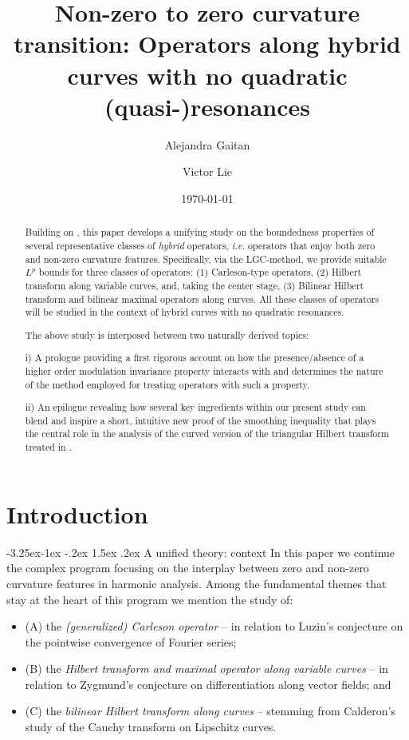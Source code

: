 \documentclass[a4paper,reqno]{amsart}
\title[Operators along hybrid curves]{\Large{Non-zero to zero curvature transition: Operators along hybrid curves with no quadratic (quasi-)resonances}}
\author[A. Gaitan]{Alejandra Gaitan}
\author[V. Lie]{Victor Lie}
\date{\today}
\makeatletter
\def\subsection{\@startsection{subsection}{2}{\z@}%
	{-3.25ex\@plus -1ex \@minus -.2ex}%
	{1.5ex \@plus .2ex}%
	{\normalfont\bfseries\boldmath}}
\numberwithin{equation}{section}
\theoremstyle{definition}
\makeatother
\begin{document}
\maketitle

\begin{abstract} Building on \cite{Lie19}, this paper develops a unifying study on the boundedness properties of several representative classes of \emph{hybrid} operators, \textit{i.e.} operators that enjoy both zero and non-zero curvature features. Specifically, via the LGC-method, we provide suitable $L^p$ bounds for three classes of operators: (1) Carleson-type operators, (2) Hilbert transform along variable curves, and, taking the center stage, (3) Bilinear Hilbert transform and bilinear maximal operators along curves. All these classes of operators will be studied in the context of hybrid curves with no quadratic resonances.

The above study is interposed between two naturally derived topics:

i) A prologue providing a first rigorous account on how the presence/absence of a higher order modulation invariance property interacts with and determines the nature of the method employed for treating operators with such a property.

ii) An epilogue revealing how several key ingredients within our present study can blend and inspire a short, intuitive new proof of the smoothing inequality that plays the central role in the analysis of the curved version of the triangular Hilbert transform treated in \cite{CDR20}.
\end{abstract}

\setcounter{tocdepth}{2}
\tableofcontents
\section{Introduction}


\subsection{A unified theory: context}\label{cont}
In this paper we continue the complex program focusing on the interplay between zero and non-zero curvature features in harmonic analysis. Among the fundamental themes that stay at the heart of this program we mention the study of:
\begin{itemize}
	\item (A) the \emph{(generalized) Carleson operator} -- in relation to Luzin's conjecture on the pointwise convergence of Fourier series;
	\item (B) the \emph{Hilbert transform and maximal operator along variable curves} -- in relation to Zygmund's conjecture on differentiation along vector fields; and
	\item (C) the \emph{bilinear Hilbert transform along curves} -- stemming from Calderon's study of the Cauchy transform on Lipschitz curves.
\end{itemize}
\end{document}
